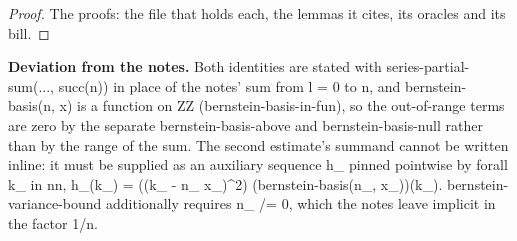 %
\begin{proof}
%
The proofs: the file that holds each, the lemmas it cites, its oracles and its bill.
%
%
%
%
%
%
%
%
%
\end{proof}
%
\noindent\textbf{Deviation from the notes.} Both identities are stated with series-partial-sum(..., succ(n)) in place of the notes' sum from l = 0 to n, and bernstein-basis(n, x) is a function on ZZ (bernstein-basis-in-fun), so the out-of-range terms are zero by the separate bernstein-basis-above and bernstein-basis-null rather than by the range of the sum. The second estimate's summand cannot be written inline: it must be supplied as an auxiliary sequence h\_ pinned pointwise by forall k\_ in nn, h\_(k\_) = ((k\_ - n\_ x\_)\textasciicircum{}2) (bernstein-basis(n\_, x\_))(k\_). bernstein-variance-bound additionally requires n\_ /= 0, which the notes leave implicit in the factor 1/n.
%
\renewcommand{\thethm}{5.5}
